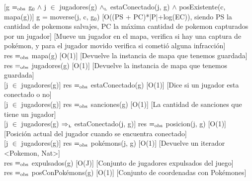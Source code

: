 [g $=_{\mathrm{obs}}$ g$_0$ $\wedge$ j $\in$ jugadores(g) $\land_{\mathrm{\scriptscriptstyle{L}}}$ estaConectado(j, g) $\wedge$ posExistente(c, mapa(g))]
{g = moverse(j, c, g$_0$)}
[O((PS + PC)*|P|+log(EC)), siendo PS la cantidad de pokemons salvajes, PC la máxima cantidad de pokemon capturados por un jugador]
[Mueve un jugador en el mapa, verifica si hay una captura de pokémon, y para el jugador movido verifica si cometió alguna infracción]\\


{res $=_{\mathrm{obs}}$ mapa(g)}
[O(1)]
[Devuelve la instancia de mapa que tenemos guardada]
\\

{res $=_{\mathrm{obs}}$ jugadores(g)}
[O(1)]
[Devuelve la instancia de mapa que tenemos guardada]
\\

[j $\in$ jugadores(g)]
{res $=_{\mathrm{obs}}$ estaConectado(g)}
[O(1)]
[Dice si un jugador esta conectado o no]
\\

[j $\in$ jugadores(g)]
{res $=_{\mathrm{obs}}$ sanciones(g)}
[O(1)]
[La cantidad de sanciones que tiene un jugador]
\\

[j $\in$ jugadores(g) $\Rightarrow_{\mathrm{\scriptscriptstyle{L}}}$ estaConectado(j, g)]
{res $=_{\mathrm{obs}}$ posicion(j, g)}
[O(1)]
[Posici\'on actual del jugador cuando se encuentra conectado]
\\

[j $\in$ jugadores(g)]
{res $=_{\mathrm{obs}}$ pok\'emons(j, g)}
[O(1)]
[Devuelve un iterador <Pokemon, Nat>]
\\

{res $=_{\mathrm{obs}}$ expulsados(g)}
[O(J)]
[Conjunto de jugadores expulsados del juego]
\\

{res $=_{\mathrm{obs}}$ posConPok\'emons(g)}
[O(1)]
[Conjunto de coordenadas con Pok\'emones]
\\

